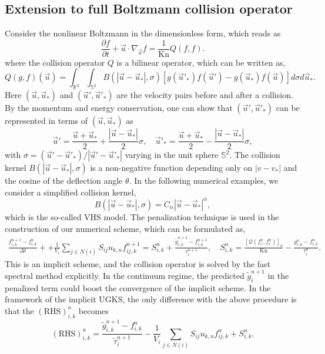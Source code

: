 \documentclass[3p,12pt]{elsarticle}
\begin{document}
	\subsection{Extension to full Boltzmann collision operator}
	Consider the nonlinear Boltzmann in the dimensionless form, which reads as
	\begin{equation}
		\frac{\partial f}{\partial t} + \vec{u} \cdot \nabla_{\vec{x}} f = \frac{1}{\mathrm{Kn}}Q(f,f).
	\end{equation}
	where the collision operator $Q$ is a bilinear operator, which can be written as,
	\begin{equation}
		Q(g,f)(\vec{u}) = \int_{\mathbb{R}^3}\int_{\mathbb{S}^{2}}B(|\vec{u}-\vec{u}_{*}|,\sigma) \left[ g(\vec{u}'_{*})f(\vec{u}') - g(\vec{u}_{*})f(\vec{u})\right]d\sigma d\vec{u}_{*}.
	\end{equation}
	Here $(\vec{u},\vec{u}_{*})$ and $(\vec{u}',\vec{u}'_*)$ are the velocity pairs before and after a collision. By the momentum and energy conservation, one can show that $(\vec{u}',\vec{u}'_*)$ can be represented in terms of $(\vec{u},\vec{u}_*)$ as
	\begin{equation}
		\vec{u}' = \frac{\vec{u} + \vec{u}_*}{2} + \frac{|\vec{u} - \vec{u}_*|}{2}\sigma, \quad  \vec{u}'_* = \frac{\vec{u} + \vec{u}_*}{2} - \frac{|\vec{u} - \vec{u}_*|}{2}\sigma ,
	\end{equation}
	with $\sigma = (\vec{u}' - \vec{u}'_*)/|\vec{u}' - \vec{u}'_*|$ varying in the unit sphere $\mathbb{S}^{2}$. The collision kernel $B(|\vec{u}-\vec{u}_{*}|,\sigma)$ is a non-negative function depending only on $|v-v_{*}|$ and the cosine of the deflection angle $\theta$. In the following numerical examples, we consider a simplified collision kernel,
	\begin{equation}
		B(|\vec{u}-\vec{u}_{*}|,\sigma) = C_{\alpha}|\vec{u} - \vec{u}_*|^{\alpha},
	\end{equation}
	which is the so-called VHS model. The penalization technique \cite{filbet2010class} is used in the construction of our numerical scheme, which can be formulated as,
	\begin{equation}\label{numerical}
\begin{aligned}
		\frac{f_{i,k}^{n+1}-f_{i,k}^{n}}{\Delta t}+ + \frac{1}{V_i}\sum_{j\in N(i)}S_{ij}u_{k,n}f_{ij,k}^{n+1}=S_{i,k}^n+ \frac{\tilde{g}_{i,k}^{n+1}-f_{i,k}^{n+1}}{\tau_i^{n+1}} , \quad S_{i,k}^n = \frac{\left[ \mathcal{Q}\left(f_i^{n},f_i^n\right)\right]_k}{\mathrm{Kn}}-\frac{g_{i,k}^{n}-f_{i,k}^{n}}{\tau_i^n}.
\end{aligned}
	\end{equation}
	This is an implicit scheme, and the collision operator is solved by the fast spectral method explicitly. In the continuum regime, the predicted $\tilde{g}_i^{n+1}$ in the penalized term could boost the convergence of the implicit scheme. In the framework of the implicit UGKS, the only difference with the above procedure is that the $(\text{RHS})_{i,k}^n$ becomes
	\begin{equation}
		(\text{RHS})_{i,k}^n = \frac{\tilde{g}_{i, k}^{n+1}-f_{i, k}^{n}}{\tilde{\tau}_{i}^{n+1}}-\frac{1}{V_i}\sum_{j \in N(i)} S_{i j} u_{k, n} f_{i j, k}^{n} + S^n_{i,k}.
	\end{equation}
	
\end{document}
